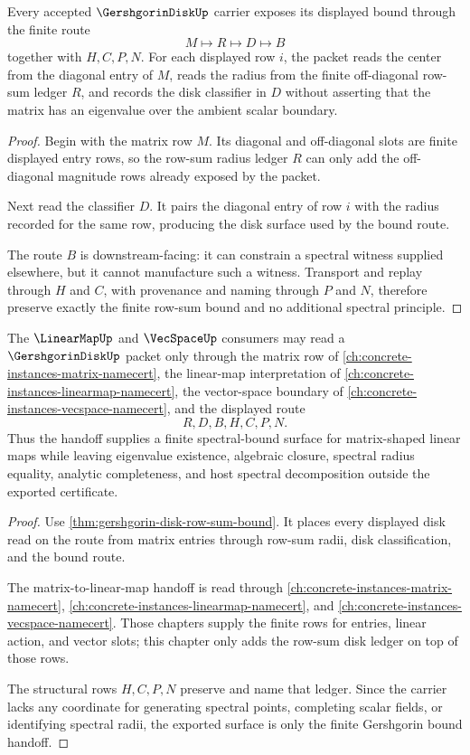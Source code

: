 \begin{theorem}\label{thm:gershgorin-disk-row-sum-bound}
Every accepted $\GershgorinDiskUp$ carrier exposes its displayed bound through the finite route
$$
M\longmapsto R\longmapsto D\longmapsto B
$$
together with $H,C,P,N$. For each displayed row $i$, the packet reads the center from the diagonal entry of $M$, reads the radius from the finite off-diagonal row-sum ledger $R$, and records the disk classifier in $D$ without asserting that the matrix has an eigenvalue over the ambient scalar boundary.
\end{theorem}
\begin{proof}
Begin with the matrix row $M$. Its diagonal and off-diagonal slots are finite displayed entry rows, so the row-sum radius ledger $R$ can only add the off-diagonal magnitude rows already exposed by the packet.

Next read the classifier $D$. It pairs the diagonal entry of row $i$ with the radius recorded for the same row, producing the disk surface used by the bound route.

The route $B$ is downstream-facing: it can constrain a spectral witness supplied elsewhere, but it cannot manufacture such a witness. Transport and replay through $H$ and $C$, with provenance and naming through $P$ and $N$, therefore preserve exactly the finite row-sum bound and no additional spectral principle.
\end{proof}

\begin{theorem}\label{thm:gershgorin-disk-matrix-handoff}
The $\LinearMapUp$ and $\VecSpaceUp$ consumers may read a $\GershgorinDiskUp$ packet only through the matrix row of \autoref{ch:concrete-instances-matrix-namecert}, the linear-map interpretation of \autoref{ch:concrete-instances-linearmap-namecert}, the vector-space boundary of \autoref{ch:concrete-instances-vecspace-namecert}, and the displayed route
$$
R,D,B,H,C,P,N.
$$
Thus the handoff supplies a finite spectral-bound surface for matrix-shaped linear maps while leaving eigenvalue existence, algebraic closure, spectral radius equality, analytic completeness, and host spectral decomposition outside the exported certificate.
\end{theorem}
\begin{proof}
Use \autoref{thm:gershgorin-disk-row-sum-bound}. It places every displayed disk read on the route from matrix entries through row-sum radii, disk classification, and the bound route.

The matrix-to-linear-map handoff is read through \autoref{ch:concrete-instances-matrix-namecert}, \autoref{ch:concrete-instances-linearmap-namecert}, and \autoref{ch:concrete-instances-vecspace-namecert}. Those chapters supply the finite rows for entries, linear action, and vector slots; this chapter only adds the row-sum disk ledger on top of those rows.

The structural rows $H,C,P,N$ preserve and name that ledger. Since the carrier lacks any coordinate for generating spectral points, completing scalar fields, or identifying spectral radii, the exported surface is only the finite Gershgorin bound handoff.
\end{proof}

